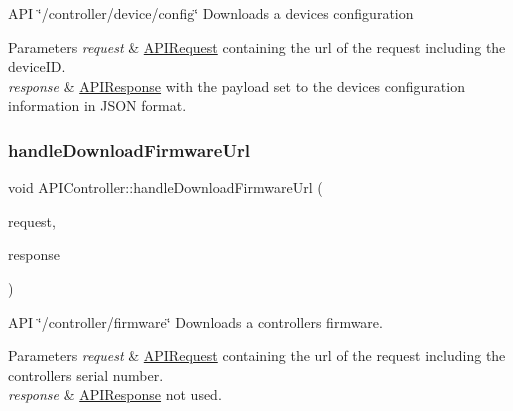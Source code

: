 A\+PI \char`\"{}/controller/device/config\char`\"{} Downloads a device\textquotesingle{}s configuration 
\begin{DoxyParams}{Parameters}
{\em request} & \hyperlink{class_a_p_i_request}{A\+P\+I\+Request} containing the url of the request including the device\+ID. \\
\hline
{\em response} & \hyperlink{class_a_p_i_response}{A\+P\+I\+Response} with the payload set to the device\textquotesingle{}s configuration information in J\+S\+ON format. \\
\hline
\end{DoxyParams}
\mbox{\label{class_a_p_i_controller_afb480d438e18a2551229810280a65806}} 
\subsubsection{\texorpdfstring{handle\+Download\+Firmware\+Url}{handleDownloadFirmwareUrl}}
{\footnotesize\ttfamily void A\+P\+I\+Controller\+::handle\+Download\+Firmware\+Url (\begin{DoxyParamCaption}\item[{const \hyperlink{class_a_p_i_request}{A\+P\+I\+Request} \&}]{request,  }\item[{\hyperlink{class_a_p_i_response}{A\+P\+I\+Response} $\ast$}]{response }\end{DoxyParamCaption})\hspace{0.3cm}{\ttfamily [slot]}}

A\+PI \char`\"{}/controller/firmware\char`\"{} Downloads a controller\textquotesingle{}s firmware. 
\begin{DoxyParams}{Parameters}
{\em request} & \hyperlink{class_a_p_i_request}{A\+P\+I\+Request} containing the url of the request including the controller\textquotesingle{}s serial number. \\
\hline
{\em response} & \hyperlink{class_a_p_i_response}{A\+P\+I\+Response} not used. \\
\hline
\end{DoxyParams}
\mbox{\label{class_a_p_i_controller_ad37a3ecaf99e3b7c43ecb4ec4873fea9}} 
